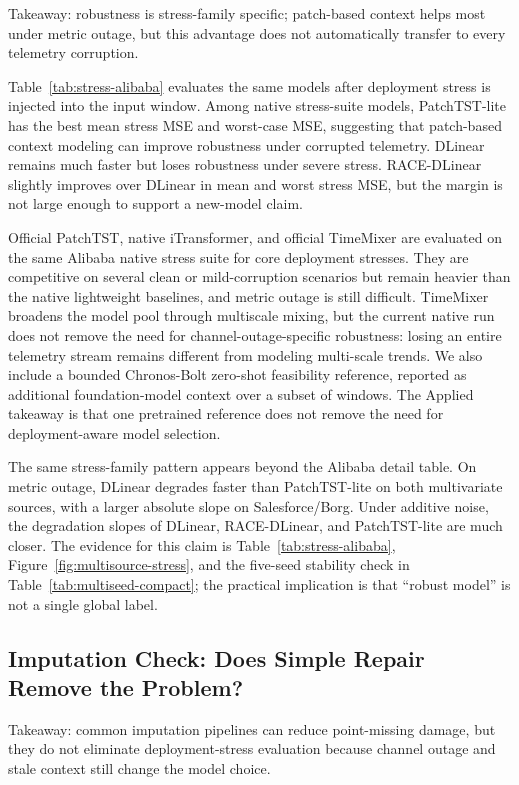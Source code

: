 \documentclass[conference]{IEEEtran}
\begin{document}
Takeaway: robustness is stress-family specific; patch-based context helps most under metric outage, but this advantage does not automatically transfer to every telemetry corruption.

Table~\ref{tab:stress-alibaba} evaluates the same models after deployment stress is injected into the input window. Among native stress-suite models, PatchTST-lite has the best mean stress MSE and worst-case MSE, suggesting that patch-based context modeling can improve robustness under corrupted telemetry. DLinear remains much faster but loses robustness under severe stress. RACE-DLinear slightly improves over DLinear in mean and worst stress MSE, but the margin is not large enough to support a new-model claim.

Official PatchTST, native iTransformer, and official TimeMixer are evaluated on the same Alibaba native stress suite for core deployment stresses. They are competitive on several clean or mild-corruption scenarios but remain heavier than the native lightweight baselines, and metric outage is still difficult. TimeMixer broadens the model pool through multiscale mixing, but the current native run does not remove the need for channel-outage-specific robustness: losing an entire telemetry stream remains different from modeling multi-scale trends. We also include a bounded Chronos-Bolt zero-shot feasibility reference, reported as additional foundation-model context over a subset of windows. The Applied takeaway is that one pretrained reference does not remove the need for deployment-aware model selection.



The same stress-family pattern appears beyond the Alibaba detail table. On metric outage, DLinear degrades faster than PatchTST-lite on both multivariate sources, with a larger absolute slope on Salesforce/Borg. Under additive noise, the degradation slopes of DLinear, RACE-DLinear, and PatchTST-lite are much closer. The evidence for this claim is Table~\ref{tab:stress-alibaba}, Figure~\ref{fig:multisource-stress}, and the five-seed stability check in Table~\ref{tab:multiseed-compact}; the practical implication is that ``robust model'' is not a single global label.

\subsection{Imputation Check: Does Simple Repair Remove the Problem?}

Takeaway: common imputation pipelines can reduce point-missing damage, but they do not eliminate deployment-stress evaluation because channel outage and stale context still change the model choice.
\end{document}
